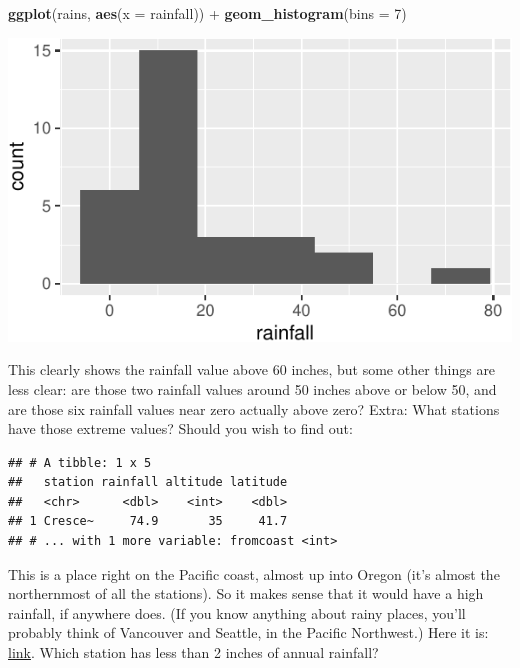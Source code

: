 \documentclass[]{tufte-book}
\newenvironment{Shaded}{}{}
\newcommand{\DataTypeTok}[1]{\textcolor[rgb]{0.56,0.13,0.00}{#1}}
\newcommand{\DecValTok}[1]{\textcolor[rgb]{0.25,0.63,0.44}{#1}}
\newcommand{\KeywordTok}[1]{\textcolor[rgb]{0.00,0.44,0.13}{\textbf{#1}}}
\newcommand{\NormalTok}[1]{#1}
\newcommand{\OperatorTok}[1]{\textcolor[rgb]{0.40,0.40,0.40}{#1}}
\newcommand{\StringTok}[1]{\textcolor[rgb]{0.25,0.44,0.63}{#1}}
\theoremstyle{definition}
\theoremstyle{definition}
\theoremstyle{definition}
\theoremstyle{remark}
\begin{document}
\begin{Shaded}
\begin{Highlighting}[]
\KeywordTok{ggplot}\NormalTok{(rains, }\KeywordTok{aes}\NormalTok{(}\DataTypeTok{x =}\NormalTok{ rainfall)) }\OperatorTok{+}\StringTok{ }\KeywordTok{geom_histogram}\NormalTok{(}\DataTypeTok{bins =} \DecValTok{7}\NormalTok{)}
\end{Highlighting}
\end{Shaded}

\includegraphics{12-regression_files/figure-latex/unnamed-chunk-5-1}

This clearly shows the rainfall value above 60 inches, but some other
things are less clear: are those two rainfall values around 50 inches
above or below 50, and are those six rainfall values near zero actually
above zero? Extra: What stations have those extreme values? Should you
wish to find out:

\begin{Shaded}
\end{Shaded}

\begin{verbatim}
## # A tibble: 1 x 5
##   station rainfall altitude latitude
##   <chr>      <dbl>    <int>    <dbl>
## 1 Cresce~     74.9       35     41.7
## # ... with 1 more variable: fromcoast <int>
\end{verbatim}

This is a place right on the Pacific coast, almost up into Oregon (it's
almost the northernmost of all the stations). So it makes sense that it
would have a high rainfall, if anywhere does. (If you know anything
about rainy places, you'll probably think of Vancouver and Seattle, in
the Pacific Northwest.) Here it is:
\href{https://www.google.ca/maps/place/Crescent+City,+CA,+USA/@41.7552589,-123.9652917,8.42z/data=!4m5!3m4!1s0x54d066375c6288db:0x76e89ab07375e62e!8m2!3d41.7557501!4d-124.2025913}{link}.
Which station has less than 2 inches of annual rainfall?
\end{document}
